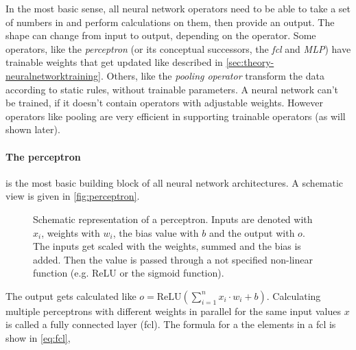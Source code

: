 In the most basic sense, all neural network operators need to be able to take a set of numbers in and perform calculations on them, then provide an output.
The shape can change from input to output, depending on the operator.
Some operators, like the \emph{perceptron} (or its conceptual successors, the \emph{fcl} and \emph{MLP}) have trainable weights that get updated like described in \autoref{sec:theory-neuralnetworktraining}.
Others, like the \emph{pooling operator} transform the data according to static rules, without trainable parameters.
A neural network can't be trained, if it doesn't contain operators with adjustable weights.
However operators like pooling are very efficient in supporting trainable operators (as will shown later).

\paragraph{The perceptron} is the most basic building block of all neural network architectures.
A schematic view is given in \autoref{fig:perceptron}.

\begin{figure}[htbp]
    \centering
    \caption{Schematic representation of a perceptron. Inputs are denoted with $x_i$, weights with $w_i$, the bias value with $b$ and the output with $o$. 
        The inputs get scaled with the weights, summed and the bias is added.
        Then the value is passed through a not specified non-linear function (e.g. ReLU or the sigmoid function).
    }
    \label{fig:perceptron}
\end{figure}

The output gets calculated like $o = \mathrm{ReLU} \left(\sum\limits_{i=1}^{n} x_i\cdot w_i + b\right)$.
Calculating multiple perceptrons with different weights in parallel for the same input values $x$ is called a fully connected layer (fcl).
The formula for a the elements in a fcl is show in \autoref{eq:fcl},

